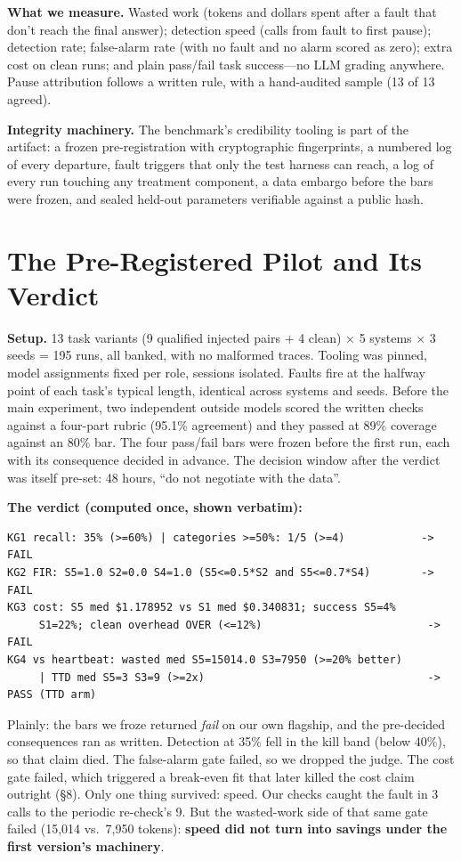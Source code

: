 \documentclass[acmsmall,screen]{acmart}
\begin{document}
\textbf{What we measure.} Wasted work (tokens and dollars spent after a fault
that don't reach the final answer); detection speed (calls from fault to first
pause); detection rate; false-alarm rate (with no fault and no alarm scored as
zero); extra cost on clean runs; and plain pass/fail task success---no LLM
grading anywhere. Pause attribution follows a written rule, with a hand-audited
sample (13 of 13 agreed).

\textbf{Integrity machinery.} The benchmark's credibility tooling is part of
the artifact: a frozen pre-registration with cryptographic fingerprints, a
numbered log of every departure, fault triggers that only the test harness can
reach, a log of every run touching any treatment component, a data embargo
before the bars were frozen, and sealed held-out parameters verifiable against a
public hash.

\section{The Pre-Registered Pilot and Its Verdict}
\textbf{Setup.} 13 task variants (9 qualified injected pairs + 4 clean) $\times$
5 systems $\times$ 3 seeds = 195 runs, all banked, with no malformed traces.
Tooling was pinned, model assignments fixed per role, sessions isolated. Faults
fire at the halfway point of each task's typical length, identical across
systems and seeds. Before the main experiment, two independent outside models
scored the written checks against a four-part rubric (95.1\% agreement) and they
passed at 89\% coverage against an 80\% bar. The four pass/fail bars were frozen
before the first run, each with its consequence decided in advance. The decision
window after the verdict was itself pre-set: 48 hours, ``do not negotiate with
the data''.

\textbf{The verdict (computed once, shown verbatim):}

\begin{lstlisting}
KG1 recall: 35% (>=60%) | categories >=50%: 1/5 (>=4)            -> FAIL
KG2 FIR: S5=1.0 S2=0.0 S4=1.0 (S5<=0.5*S2 and S5<=0.7*S4)        -> FAIL
KG3 cost: S5 med $1.178952 vs S1 med $0.340831; success S5=4%
     S1=22%; clean overhead OVER (<=12%)                          -> FAIL
KG4 vs heartbeat: wasted med S5=15014.0 S3=7950 (>=20% better)
     | TTD med S5=3 S3=9 (>=2x)                                   -> PASS (TTD arm)
\end{lstlisting}

Plainly: the bars we froze returned \emph{fail} on our own flagship, and the
pre-decided consequences ran as written. Detection at 35\% fell in the kill
band (below 40\%), so that claim died. The false-alarm gate failed, so we
dropped the judge. The cost gate failed, which triggered a break-even fit that
later killed the cost claim outright (\S8). Only one thing survived: speed. Our
checks caught the fault in 3 calls to the periodic re-check's 9. But the
wasted-work side of that same gate failed (15,014 vs.\ 7,950 tokens):
\textbf{speed did not turn into savings under the first version's machinery}.
\end{document}
